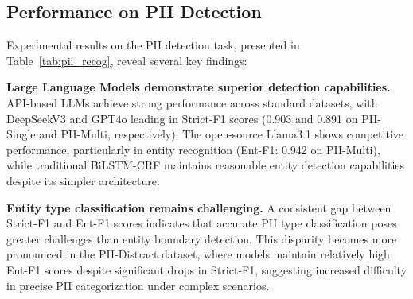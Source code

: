 \subsection{Performance on PII Detection}
Experimental results on the PII detection task, presented in Table~\ref{tab:pii_recog}, reveal several key findings:

\noindent\textbf{Large Language Models demonstrate superior detection capabilities.}
API-based LLMs achieve strong performance across standard datasets, with DeepSeekV3 and GPT4o leading in Strict-F1 scores (0.903 and 0.891 on PII-Single and PII-Multi, respectively). The open-source Llama3.1 shows competitive performance, particularly in entity recognition (Ent-F1: 0.942 on PII-Multi), while traditional BiLSTM-CRF maintains reasonable entity detection capabilities despite its simpler architecture.


\noindent\textbf{Entity type classification remains challenging.}
A consistent gap between Strict-F1 and Ent-F1 scores indicates that accurate PII type classification poses greater challenges than entity boundary detection. This disparity becomes more pronounced in the PII-Distract dataset, where models maintain relatively high Ent-F1 scores despite significant drops in Strict-F1, suggesting increased difficulty in precise PII categorization under complex scenarios.

